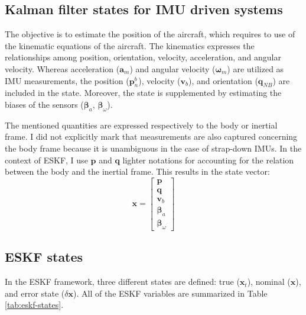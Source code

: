 \subsection{Kalman filter states for IMU driven systems}

The objective is to estimate the position of the aircraft, which requires to use of the kinematic equations of the aircraft. The kinematics expresses the relationships among position, orientation, velocity, acceleration, and angular velocity. Whereas acceleration ($\mathbf{a}_m$) and angular velocity ($\boldsymbol{\omega}_m$) are utilized as IMU measurements, the position ($\mathbf{p}_n^b$), velocity ($\mathbf{v}_b$), and orientation ($\mathbf{q}_{NB}$) are included in the state. Moreover, the state is supplemented by estimating the biases of the sensors ($\boldsymbol{\beta}_a$, $\boldsymbol{\beta}_\omega$). 

The mentioned quantities are expressed respectively to the body or inertial frame. I did not explicitly mark that measurements are also captured concerning the body frame because it is unambiguous in the case of strap-down IMUs. In the context of ESKF, I use $\mathbf{p}$ and $\mathbf{q}$ lighter notations for accounting for the relation between the body and the inertial frame. This results in the state vector:
\begin{equation}
    \mathbf{x}=\begin{bmatrix}
    \mathbf{p} \\ \mathbf{q} \\ \mathbf{v}_b \\ \boldsymbol{\beta}_a \\ \boldsymbol{\beta}_\omega
    \end{bmatrix}
\end{equation}

\subsection{ESKF states}

In the ESKF framework, three different states are defined: true ($\mathbf{x}_t$), nominal ($\mathbf{x}$), and error state ($\delta\mathbf{x}$). All of the ESKF variables are summarized in Table \ref{tab:eskf-states}.

